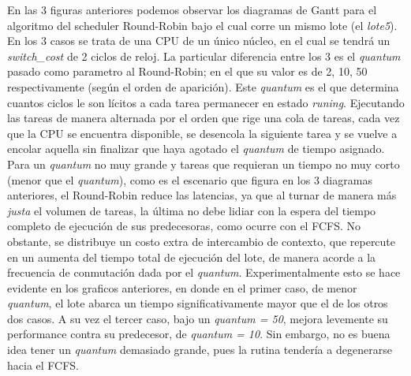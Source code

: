 En las 3 figuras anteriores podemos observar los diagramas de Gantt para el algoritmo del scheduler Round-Robin bajo el cual corre un mismo lote (el \textit{lote5}). En los 3 casos se trata de una CPU de un único núcleo, en el cual se tendrá un \textit{switch\_cost} de 2 ciclos de reloj. La particular diferencia entre los 3 es el \textit{quantum} pasado como parametro al Round-Robin; en el que su valor es de 2, 10, 50 respectivamente (según el orden de aparición). Este \textit{quantum} es el que determina cuantos ciclos le son lícitos a cada tarea permanecer en estado \textit{runing}. Ejecutando las tareas de manera alternada por el orden que rige una cola de tareas, cada vez que la CPU se encuentra disponible, se desencola la siguiente tarea y se vuelve a encolar aquella sin finalizar que haya agotado el \textit{quantum} de tiempo asignado. Para un \textit{quantum} no muy grande y tareas que requieran un tiempo no muy corto (menor que el \textit{quantum}), como es el escenario que figura en los 3 diagramas anteriores, el Round-Robin reduce las latencias, ya que al turnar de manera más \textit{justa} el volumen de tareas, la última no debe lidiar con la espera del tiempo completo de ejecución de sus predecesoras, como ocurre con el FCFS. No obstante, se distribuye un costo extra de intercambio de contexto, que repercute en un aumenta del tiempo total de ejecución del lote, de manera acorde a la frecuencia de conmutación dada por el \textit{quantum}. Experimentalmente esto se hace evidente en los graficos anteriores, en donde en el primer caso, de menor \textit{quantum}, el lote abarca un tiempo significativamente mayor que el de los otros dos casos. A su vez el tercer caso, bajo un \textit{quantum = 50}, mejora levemente su performance contra su predecesor, de \textit{quantum = 10}. Sin embargo, no es buena idea tener un \textit{quantum} demasiado grande, pues la rutina tendería a degenerarse hacia el FCFS.